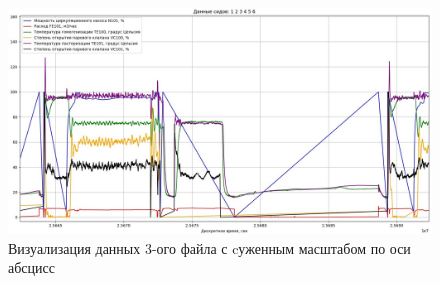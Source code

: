 {  \begin{figure}
    \centering
    \def\svgwidth{\textwidth}
    \includegraphics[scale=0.6]{images/forGeneral/data_3_visual.jpg}
    \caption{ Визуализация данных 3-ого файла с cуженным масштабом по оси абсцисс}
    \label{fig:Data3Visual}
  \end{figure}

}